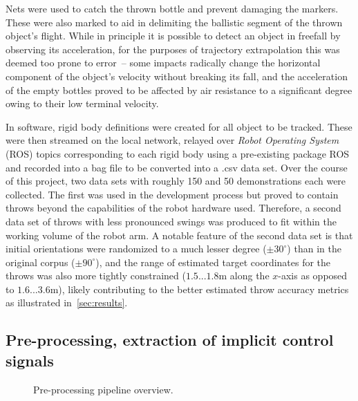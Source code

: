 \documentclass{article}
\begin{document}
Nets were used to catch the thrown bottle and prevent damaging the markers. These were also marked to aid in delimiting the ballistic segment of the thrown object's flight. While in principle it is possible to detect an object in freefall by observing its acceleration, for the purposes of trajectory extrapolation this was deemed too prone to error~-- some impacts radically change the horizontal component of the object's velocity without breaking its fall, and the acceleration of the empty bottles proved to be affected by air resistance to a significant degree owing to their low terminal velocity.

In software, rigid body definitions were created for all object to be tracked. These were then streamed on the local network, relayed over \emph{Robot Operating System} (ROS) topics corresponding to each rigid body using a pre-existing package ROS and recorded into a bag file to be converted into a .csv data set. Over the course of this project, two data sets with roughly 150 and 50 demonstrations each were collected. The first was used in the development process but proved to contain throws beyond the capabilities of the robot hardware used. Therefore, a second data set of throws with less pronounced swings was produced to fit within the working volume of the robot arm. A notable feature of the second data set is that initial orientations were randomized to a much lesser degree ($\pm30^{\circ}$) than in the original corpus ($\pm90^{\circ}$), and the range of estimated target coordinates for the throws was also more tightly constrained ($1.5 ... 1.8$m along the $x$-axis as opposed to $1.6 ... 3.6$m), likely contributing to the better estimated throw accuracy metrics as illustrated in~\ref{sec:results}.

\subsection{Pre-processing, extraction of implicit control signals}
\label{sec:preprocess}

\begin{figure}
	\centering
	\caption{Pre-processing pipeline overview.}
	\label{fig:fig2}
\end{figure}
\end{document}
